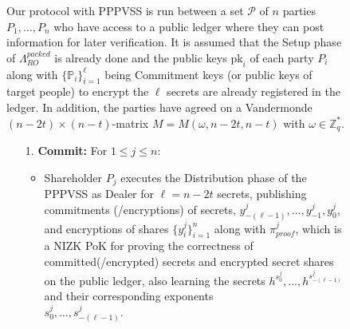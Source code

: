 \begin{figure}[ht]
    \centering
    \begin{tcolorbox}[title=\textbf{Randomness Beacon using PPPVSS}, width=0.9\textwidth, colframe=blue!75!black, colback=blue!10, sharp corners]
        Our protocol with PPPVSS is run between a set $\mathcal{P}$ of $n$ 
        parties $P_1, \dots, P_n$ who have access to a public ledger where they 
        can post information for later verification. It is assumed that the 
        Setup phase of $\Lambda_{RO}^{packed}$ is already done and the public keys 
        $\text{pk}_i$ of each party $P_i$ along with $\{\mathbb{P}_i\}_{i=1}^{\ell}$ 
        being Commitment keys (or public keys of target people) to encrypt the 
        $\ell$ secrets are already registered in the ledger. In addition, the 
        parties have agreed on a Vandermonde $(n - 2t) \times (n - t)$-matrix 
        $M = M(\omega, n - 2t, n - t)$ with $\omega \in \mathbb{Z}_q^*$.

    \begin{enumerate}
        \item [1.]\textbf{Commit:} For $1 \leq j \leq n$:
        \begin{itemize}
            \item Shareholder $P_j$ executes the Distribution phase of the 
            PPPVSS as Dealer for $\ell = n - 2t$ secrets, publishing commitments 
            (/encryptions) of secrets, $y_{-(\ell-1)}^j, \dots, y_{-1}^j, y_0^j$, 
            and encryptions of shares $\{y_i^j\}_{i=1}^n$ along with 
            $\pi_{proof}^{j}$, which is a NIZK PoK for proving the correctness of 
            committed(/encrypted) secrets and encrypted secret shares on the 
            public ledger, also learning the secrets $h^{s_0^j},...,h^{s_{-(\ell-1)}^j}$ 
            and their corresponding exponents\\ $s_0^j, \dots, s_{-(\ell-1)}^j$.
        \end{itemize}
        

\end{enumerate}
\end{tcolorbox}
\end{figure}
